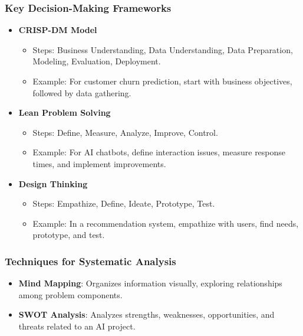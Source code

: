 \documentclass[aspectratio=169]{beamer}
\begin{document}
\begin{frame}[fragile]
    \frametitle{Key Decision-Making Frameworks}
    
    \begin{itemize}
        \item \textbf{CRISP-DM Model}
        \begin{itemize}
            \item Steps: Business Understanding, Data Understanding, Data Preparation, Modeling, Evaluation, Deployment.
            \item Example: For customer churn prediction, start with business objectives, followed by data gathering.
        \end{itemize}
        
        \item \textbf{Lean Problem Solving}
        \begin{itemize}
            \item Steps: Define, Measure, Analyze, Improve, Control.
            \item Example: For AI chatbots, define interaction issues, measure response times, and implement improvements.
        \end{itemize}
        
        \item \textbf{Design Thinking}
        \begin{itemize}
            \item Steps: Empathize, Define, Ideate, Prototype, Test.
            \item Example: In a recommendation system, empathize with users, find needs, prototype, and test.
        \end{itemize}
    \end{itemize}
\end{frame}

\begin{frame}[fragile]
    \frametitle{Techniques for Systematic Analysis}
    
    \begin{itemize}
        \item \textbf{Mind Mapping}: Organizes information visually, exploring relationships among problem components.
        \item \textbf{SWOT Analysis}: Analyzes strengths, weaknesses, opportunities, and threats related to an AI project.
    \end{itemize}
\end{frame}
\end{document}

